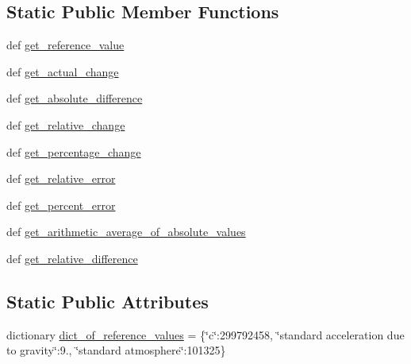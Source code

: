 \subsection*{Static Public Member Functions}
\begin{DoxyCompactItemize}
\item 
def \hyperlink{classstatistics_1_1data__analysis__tool_1_1data__analysis_a890a06cfd5f3dbb95a7d5e41ec89b8e9}{get\+\_\+reference\+\_\+value}
\item 
def \hyperlink{classstatistics_1_1data__analysis__tool_1_1data__analysis_a2559796fe2b8c7a1619e741345ff2f8d}{get\+\_\+actual\+\_\+change}
\item 
def \hyperlink{classstatistics_1_1data__analysis__tool_1_1data__analysis_a4443b2fd70b1f2632cc3e003915af2f3}{get\+\_\+absolute\+\_\+difference}
\item 
def \hyperlink{classstatistics_1_1data__analysis__tool_1_1data__analysis_a9a050987fc4c731a48d99a8db1e28c8c}{get\+\_\+relative\+\_\+change}
\item 
def \hyperlink{classstatistics_1_1data__analysis__tool_1_1data__analysis_ae013c86ec44948a2b9ac2798bd4a9cb2}{get\+\_\+percentage\+\_\+change}
\item 
def \hyperlink{classstatistics_1_1data__analysis__tool_1_1data__analysis_aac1f458b15db107e27de367591361884}{get\+\_\+relative\+\_\+error}
\item 
def \hyperlink{classstatistics_1_1data__analysis__tool_1_1data__analysis_a2c0e62016c7d45cc39b71372ccb6d028}{get\+\_\+percent\+\_\+error}
\item 
def \hyperlink{classstatistics_1_1data__analysis__tool_1_1data__analysis_a3eb98f0cd57564ad42dd8b2cef5feab5}{get\+\_\+arithmetic\+\_\+average\+\_\+of\+\_\+absolute\+\_\+values}
\item 
def \hyperlink{classstatistics_1_1data__analysis__tool_1_1data__analysis_a04973a814dd603d6603da8c4d21ea1d8}{get\+\_\+relative\+\_\+difference}
\end{DoxyCompactItemize}
\subsection*{Static Public Attributes}
\begin{DoxyCompactItemize}
\item 
dictionary \hyperlink{classstatistics_1_1data__analysis__tool_1_1data__analysis_a946ccd65157a8c3b3b9be607fcaed9f6}{dict\+\_\+of\+\_\+reference\+\_\+values} = \{\char`\"{}c\char`\"{}\+:299792458, \char`\"{}standard acceleration due to gravity\char`\"{}\+:9., \char`\"{}standard atmosphere\char`\"{}\+:101325\}
\end{DoxyCompactItemize}


